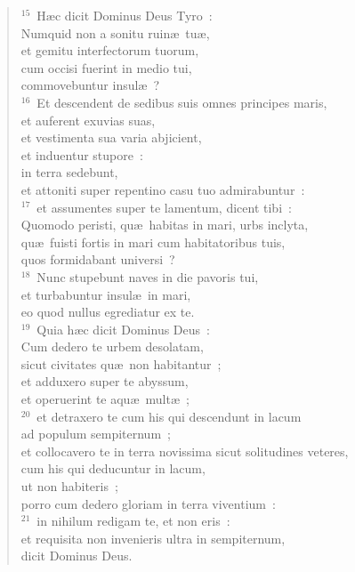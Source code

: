\begin{flushleft}
\begin{verse}
${}^{15}$~H\ae c dicit Dominus Deus Tyro~:\\ Numquid non a sonitu ruin\ae\ tu\ae ,\\ et gemitu interfectorum tuorum,\\ cum occisi fuerint in medio tui,\\ commovebuntur insul\ae~?\\
${}^{16}$~Et descendent de sedibus suis omnes principes maris,\\ et auferent exuvias suas,\\ et vestimenta sua varia abjicient,\\ et induentur stupore~:\\ in terra sedebunt,\\ et attoniti super repentino casu tuo admirabuntur~:\\
${}^{17}$~et assumentes super te lamentum, dicent tibi~:\\ Quomodo peristi, qu\ae\ habitas in mari, urbs inclyta,\\ qu\ae\ fuisti fortis in mari cum habitatoribus tuis,\\ quos formidabant universi~?\\
${}^{18}$~Nunc stupebunt naves in die pavoris tui,\\ et turbabuntur insul\ae\ in mari,\\ eo quod nullus egrediatur ex te.\\
${}^{19}$~Quia h\ae c dicit Dominus Deus~:\\ Cum dedero te urbem desolatam,\\ sicut civitates qu\ae\ non habitantur~;\\ et adduxero super te abyssum,\\ et operuerint te aqu\ae\ mult\ae~;\\
${}^{20}$~et detraxero te cum his qui descendunt in lacum\\ ad populum sempiternum~;\\ et collocavero te in terra novissima sicut solitudines veteres,\\ cum his qui deducuntur in lacum,\\ ut non habiteris~;\\ porro cum dedero gloriam in terra viventium~:\\
${}^{21}$~in nihilum redigam te, et non eris~:\\ et requisita non invenieris ultra in sempiternum,\\ dicit Dominus Deus.\end{verse}\end{flushleft}



